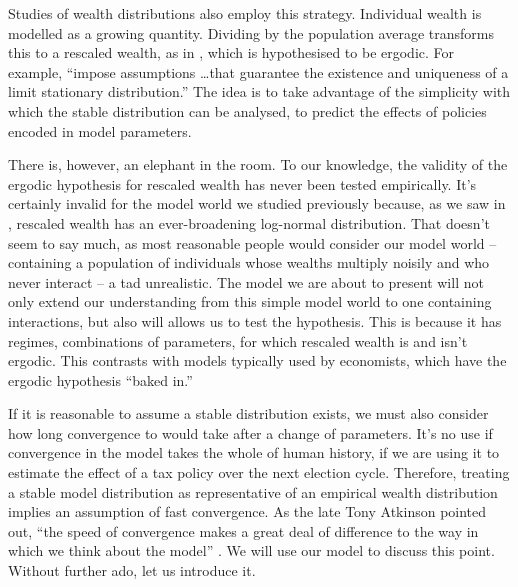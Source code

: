 Studies of wealth distributions also employ this strategy. Individual wealth is modelled as a growing quantity. Dividing by the population average transforms this to a rescaled wealth, as in , which is hypothesised to be ergodic. For example, \cite[p.~130]{BenhabibBisinZhu2011} ``impose assumptions \dots that guarantee the existence and uniqueness of a limit stationary distribution.'' The idea is to take advantage of the simplicity with which the stable distribution can be analysed, \eg to predict the effects of policies encoded in model parameters.

There is, however, an elephant in the room. To our knowledge, the validity of the ergodic hypothesis for rescaled wealth has never been tested empirically. It's certainly invalid for the \GBM model world we studied previously because, as we saw in , rescaled wealth has an ever-broadening log-normal distribution. That doesn't seem to say much, as most reasonable people would consider our model world -- containing a population of individuals whose wealths multiply noisily and who never interact -- a tad unrealistic. The model we are about to present will not only extend our understanding from this simple model world to one containing interactions, but also will allows us to test the hypothesis. This is because it has regimes, \ie combinations of parameters, for which rescaled wealth is and isn't ergodic. This contrasts with models typically used by economists, which have the ergodic hypothesis ``baked in.''

If it is reasonable to assume a stable distribution exists, we must also consider how long convergence to would take after a change of parameters. It's no use if convergence in the model takes the whole of human history, if we are using it to estimate the effect of a tax policy over the next election cycle. Therefore, treating a stable model distribution as representative of an empirical wealth distribution implies an assumption of fast convergence.  As the late Tony Atkinson pointed out, ``the speed of convergence makes a great deal of difference to the way in which we think about the model'' \cite{atkinson1969timescale}. We will use our model to discuss this point. Without further ado, let us introduce it.


